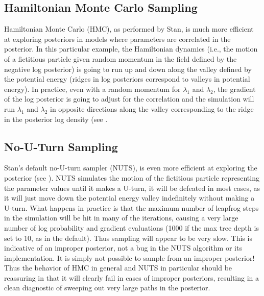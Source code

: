 \subsection{Hamiltonian Monte Carlo Sampling}

Hamiltonian Monte Carlo (HMC), as performed by Stan, is much more
efficient at exploring posteriors in models where parameters are
correlated in the posterior.  In this particular example, the
Hamiltonian dynamics (i.e., the motion of a fictitious particle given
random momentum in the field defined by the negative log posterior) is
going to run up and down along the valley defined by the potential
energy (ridges in log posteriors correspond to valleys in potential
energy).  In practice, even with a random momentum for $\lambda_1$ and
$\lambda_2$, the gradient of the log posterior is going to adjust for
the correlation and the simulation will run $\lambda_1$ and
$\lambda_2$ in opposite directions along the valley corresponding to
the ridge in the posterior log density (see
.  

\subsection{No-U-Turn Sampling}

Stan's default no-U-turn sampler (NUTS), is even more efficient at
exploring the posterior (see
\citep{Hoffman-Gelman:2011,Hoffman-Gelman:2014}).  NUTS simulates the
motion of the fictitious particle representing the parameter values
until it makes a U-turn, it will be defeated in most cases, as it will
just move down the potential energy valley indefinitely without making
a U-turn. What happens in practice is that the maximum number of
leapfrog steps in the simulation will be hit in many of the
iterations, causing a very large number of log probability and
gradient evaluations (1000 if the max tree depth is set to 10, as in
the default). Thus sampling will appear to be very slow.  This is
indicative of an improper posterior, not a bug in the NUTS algorithm
or its implementation.  It is simply not possible to sample from an
improper posterior!  Thus the behavior of HMC in general and NUTS
in particular should be reassuring in that it will clearly fail in
cases of improper posteriors, resulting in a clean diagnostic of
sweeping out very large paths in the posterior.  

